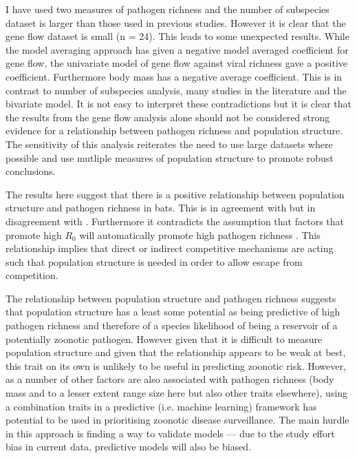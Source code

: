 I have used two measures of pathogen richness and the number of subspecies dataset is larger than those used in previous studies.
However it is clear that the gene flow dataset is small (n = 24).
This leads to some unexpected results.
While the model averaging approach has given a negative model averaged coefficient for gene flow, the univariate model of gene flow against viral richness gave a positive coefficient.
Furthermore body mass has a negative average coefficient.
This is in contrast to number of subspecies analysis, many studies in the literature \cite{kamiya2014determines, turmelle2009correlates, gay2014parasite, maganga2014bat} and the bivariate model.
It is not easy to interpret these contradictions but it is clear that the results from the gene flow analysis alone should not be considered strong evidence for a relationship between pathogen richness and population structure.
The sensitivity of this analysis reiterates the need to use large datasets where possible and use mutliple measures of population structure to promote robust conclusions.


The results here suggest that there is a positive relationship between population structure and pathogen richness in bats.
This is in agreement with \cite{maganga2014bat, turmelle2009correlates} but in disagreement with \cite{gay2014parasite}.
Furthermore it contradicts the assumption that factors that promote high $R_0$ will automatically promote high pathogen richness \cite{nunn2003comparative, morand2000wormy}.
This relationship implies that direct or indirect competitive mechanisms are acting such that population structure is needed in order to allow escape from competition.

The relationship between population structure and pathogen richness suggests that population structure has a least some potential as being predictive of high pathogen richness and therefore of a species likelihood of being a reservoir of a potentially zoonotic pathogen. 
However given that it is difficult to measure population structure and given that the relationship appears to be weak at best, this trait on its own is unlikely to be useful in predicting zoonotic risk.
However, as a number of other factors are also associated with pathogen richness (body mass and to a lesser extent range size here but also other traits elsewhere), using a combination traits in a predictive (i.e. machine learning) framework has potential to be used in prioritising zoonotic disease surveillance.
The main hurdle in this approach is finding a way to validate models --- due to the study effort bias in current data, predictive models will also be biased.

